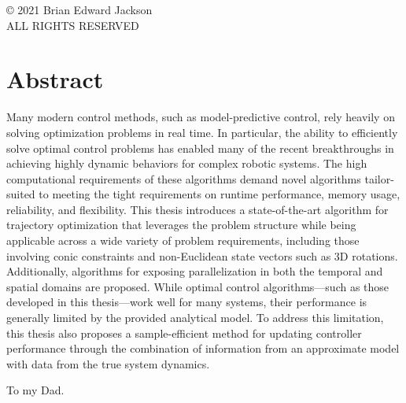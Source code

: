 \documentclass[10pt,oneside]{book}
\begin{document}
    

    \frontmatter
    
    \newpage
    \pagestyle{empty}
    \begin{center}
    \copyright{} 2021 Brian Edward Jackson \\
    ALL RIGHTS RESERVED
    \end{center}
    
    \chapter*{Abstract}
    Many modern control methods, such as model-predictive control, rely heavily
    on solving optimization problems in real time. In particular, the ability to
    efficiently solve optimal control problems has enabled many of the recent
    breakthroughs in achieving highly dynamic behaviors for complex robotic
    systems. The high computational requirements of these algorithms demand novel
    algorithms tailor-suited to meeting the tight requirements on runtime
    performance, memory usage, reliability, and flexibility. This thesis
    introduces a state-of-the-art algorithm for trajectory optimization that
    leverages the problem structure while being applicable across a wide variety
    of problem requirements, including those involving conic constraints and
    non-Euclidean state vectors such as 3D rotations. Additionally, algorithms for 
    exposing parallelization in both the temporal and spatial domains are proposed.
    While optimal control algorithms---such as those developed in this thesis---work 
    well for many systems, their performance is generally limited by the provided 
    analytical model. To address this limitation, this thesis also 
    proposes a sample-efficient method for updating controller performance 
    through the combination of information from an approximate model with data from 
    the true system dynamics. 


    \pagebreak
    \hspace{0pt}
    \vfill
    \begin{center}
    To my Dad.
    \end{center}
    \vfill
    \hspace{0pt}
    \pagebreak
\end{document}
